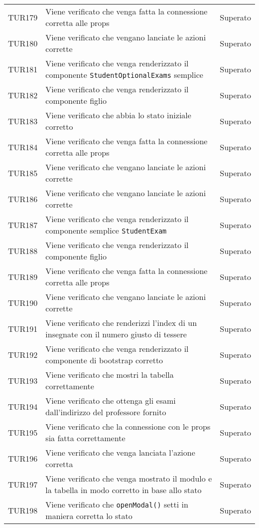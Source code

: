 \documentclass[PianoDiQualifica.tex]{subfiles}
\begin{document}
\begin{longtable}[H]{P{2cm}P{8.5cm}P{3cm}}
	TUR179 & Viene verificato che venga fatta la connessione corretta alle props & Superato \\
	TUR180 & Viene verificato che vengano lanciate le azioni corrette & Superato \\
	TUR181 & Viene verificato che venga renderizzato il componente \texttt{StudentOptionalExams} semplice & Superato \\
	TUR182 & Viene verificato che venga renderizzato il componente figlio & Superato \\
	TUR183 & Viene verificato che abbia lo stato iniziale corretto & Superato \\
	TUR184 & Viene verificato che venga fatta la connessione corretta alle props & Superato \\
	TUR185 & Viene verificato che vengano lanciate le azioni corrette & Superato \\
	TUR186 & Viene verificato che vengano lanciate le azioni corrette & Superato \\
	TUR187 & Viene verificato che venga renderizzato il componente semplice \texttt{StudentExam} & Superato \\
	TUR188 & Viene verificato che venga renderizzato il componente figlio & Superato \\
	TUR189 & Viene verificato che venga fatta la connessione corretta alle props & Superato \\
	TUR190 & Viene verificato che vengano lanciate le azioni corrette & Superato \\
	TUR191 & Viene verificato che renderizzi l'index di un insegnate con il numero giusto di tessere & Superato \\
	TUR192 & Viene verificato che venga renderizzato il componente di bootstrap corretto & Superato \\
	TUR193 & Viene verificato che mostri la tabella correttamente & Superato \\
	TUR194 & Viene verificato che ottenga gli esami dall'indirizzo del professore fornito & Superato \\
	TUR195 & Viene verificato che la connessione con le props sia fatta correttamente & Superato \\
	TUR196 & Viene verificato che venga lanciata l'azione corretta & Superato \\
	TUR197 & Viene verificato che venga mostrato il modulo e la tabella in modo corretto in base allo stato & Superato \\
	TUR198 & Viene verificato che \texttt{openModal()} setti in maniera corretta lo stato & Superato \\

\end{longtable}
\end{document}
